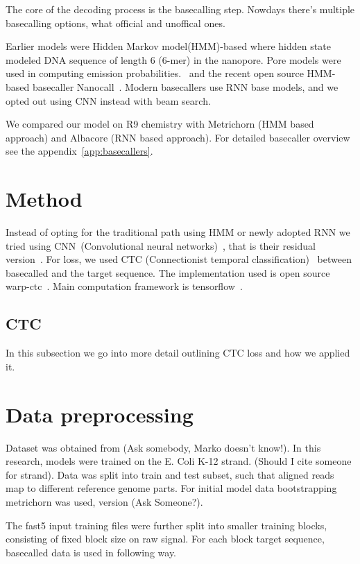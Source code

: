 \documentclass[runningheads,a4paper]{llncs}
\begin{document}
The core of the decoding process is the basecalling step. Nowdays there's multiple basecalling options, what official and unoffical ones.

Earlier models were Hidden Markov model(HMM)-based where hidden state modeled DNA sequence of length 6 (6-mer) in the nanopore. Pore models were used in computing emission probabilities.~\cite{loman2015complete,schreiber2015analysis,szalay2015novo,timp2012dna} and the recent open source HMM-based basecaller Nanocall~\cite{david2016nanocall}. Modern basecallers use RNN base models, and we opted out using CNN instead with beam search.

We compared our model on R9 chemistry with Metrichorn (HMM based approach) and Albacore (RNN based approach). For detailed basecaller overview  see the appendix~\ref{app:basecallers}.

\section{Method}

Instead of opting for the traditional path using HMM or newly adopted RNN we tried using CNN~(Convolutional neural networks)~\cite{lecun-98}, that is their residual version~\cite{he2016deep}. For loss, we used CTC (Connectionist temporal classification)~\cite{graves2006connectionist} between basecalled and the target sequence. The implementation used is open source warp-ctc~\cite{warpctc}. Main computation framework is tensorflow~\cite{tensorflow2015-whitepaper}.

\subsection{CTC}
In this subsection we go into more detail outlining CTC loss and how we applied it.


\section{Data preprocessing}

Dataset was obtained from (Ask somebody, Marko doesn't know!). In this research, models were trained on the E. Coli K-12 strand. (Should I cite someone for strand). Data was split into train and test subset, such that aligned reads map to different reference genome parts. For initial model data bootstrapping metrichorn was used, version (Ask Someone?).

The fast5 input training files were further split into smaller training blocks, consisting of fixed block size on raw signal. For each block target sequence, basecalled data is used in following way.
\end{document}
